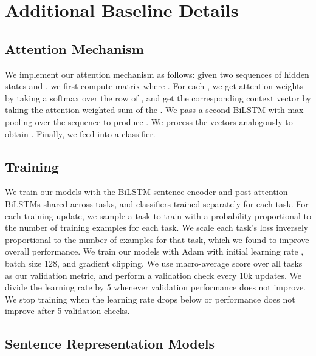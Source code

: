 \documentclass{article} \usepackage{iclr2019_conference,times}
\begin{document}
\section{Additional Baseline Details}\label{sec:apdx_baselines}

\subsection{Attention Mechanism}

We implement our attention mechanism as follows:
given two sequences of hidden states  and , we first compute matrix  where .
For each , we get attention weights  by taking a softmax over the  row of , and get the corresponding context vector  by taking the attention-weighted sum of the . 
We pass a second BiLSTM with max pooling over the sequence  to produce .
We process the  vectors analogously to obtain .
Finally, we feed  into a classifier.

\subsection{Training}

We train our models with the BiLSTM sentence encoder and post-attention BiLSTMs shared across tasks, and classifiers trained separately for each task.
For each training update, we sample a task to train with a probability proportional to the number of training examples for each task.
We scale each task's loss inversely proportional to the number of examples for that task, which we found to improve overall performance.
We train our models with Adam \citep{kingma2014adam} with initial learning rate , batch size 128, and gradient clipping.
We use macro-average score over all tasks as our validation metric, and perform a validation check every 10k updates.  
We divide the learning rate by 5 whenever validation performance does not improve. 
We stop training when the learning rate drops below  or performance does not improve after 5 validation checks. 

\subsection{Sentence Representation Models}
\end{document}
